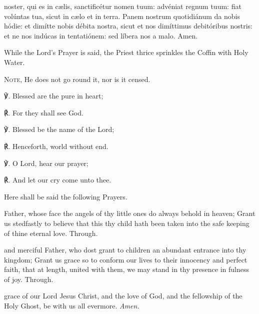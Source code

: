 { noster, qui es in c{\ae}lis, sanctificétur nomen tuum: advéniat regnum tuum: fiat volúntas tua, sicut in c{\ae}lo et in terra. Panem nostrum quotidiánum da nobis hódie: et dimítte nobis débita nostra, sicut et nos dimíttimus debitóribus nostris: et ne nos indúcas in tentatiónem: sed líbera nos a malo. Amen.}
\begin{rubric}
    While the Lord's Prayer is said, the Priest thrice sprinkles the Coffin with Holy Water.\par
    \textsc{Note,} He does not go round it, nor is it censed.
\end{rubric}\par
℣. Blessed are the pure in heart;\par
℟. For they shall see God.\par
℣. Blessed be the name of the Lord;\par
℟. Henceforth, world without end.\par
℣. O Lord, hear our prayer;\par
℟. And let our cry come unto thee.\par
\begin{rubric}
    Here shall be said the following Prayers.
\end{rubric}\par
{}
 Father, whose face the angels of thy little ones do always behold in heaven; Grant us stedfastly to believe that this thy child hath been taken into the safe keeping of thine eternal love. Through.\par
{}
 and merciful Father, who dost grant to children an abundant entrance into thy kingdom; Grant us grace so to conform our lives to their innocency and perfect faith, that at length, united with them, we may stand in thy presence in fulness of joy. Through.\par
{}
 grace of our Lord Jesus {} Christ, and the love of God, and the fellowship of the Holy Ghost, be with us all evermore. \textit{Amen.}\\

